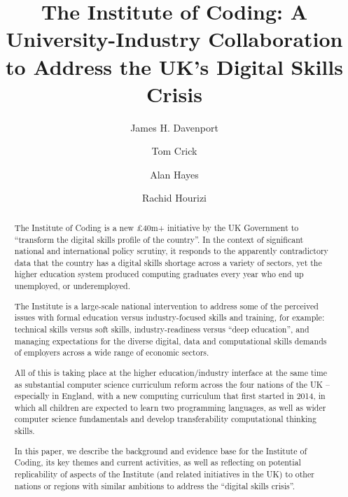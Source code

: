 \documentclass[sigconf,anonymous]{acmart}
\begin{document}
\title{The Institute of Coding: A University-Industry Collaboration to Address the UK's Digital Skills Crisis}
\author{James H. Davenport}

\author{Tom Crick}

\author{Alan Hayes}

\author{Rachid Hourizi}
 
\renewcommand{\shortauthors}{Davenport et al.}


\begin{abstract}
The Institute of Coding is a new \pounds40m+ initiative by the UK
Government to ``transform the digital skills profile of the
country''. In the context of significant national and international
policy scrutiny, it responds to the apparently contradictory data that
the country has a digital skills shortage across a variety of sectors,
yet the higher education system produced computing graduates every
year who end up unemployed, or underemployed.

The Institute is a large-scale national intervention to address some
of the perceived issues with formal education versus industry-focused
skills and training, for example: technical skills versus soft skills,
industry-readiness versus ``deep education'', and managing
expectations for the diverse digital, data and computational skills
demands of employers across a wide range of economic sectors.

All of this is taking place at the higher education/industry interface
at the same time as substantial computer science curriculum reform
across the four nations of the UK -- especially in England, with a new
computing curriculum that first started in 2014, in which all children
are expected to learn two programming languages, as well as wider
computer science fundamentals and develop transferability
computational thinking skills.

In this paper, we describe the background and evidence base for the
Institute of Coding, its key themes and current activities, as well as
reflecting on potential replicability of aspects of the Institute (and
related initiatives in the UK) to other nations or regions with
similar ambitions to address the ``digital skills crisis''.
\end{abstract}
\end{document}

